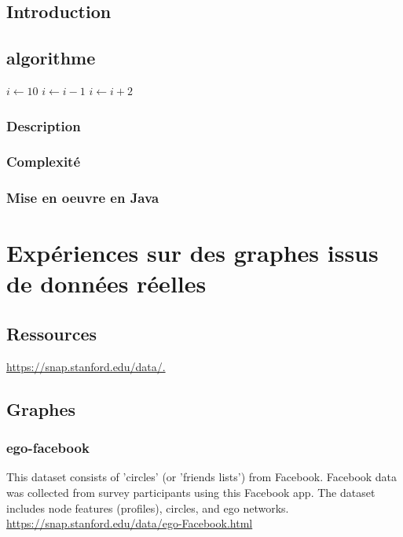 \subsection{Introduction}
\subsection{algorithme}
\begin{algorithmic}
\State $i \gets 10$
    \State $i \gets i-1$
\Else
        \State $i \gets i+2$
    \EndIf
\EndIf
\end{algorithmic}
\subsubsection{Description}
\subsubsection{Complexité}
\subsubsection{Mise en oeuvre en Java }

\newpage

\section{Expériences sur des graphes issus de données réelles }

\subsection{Ressources }

\cite{snapnets}



\href{https://snap.stanford.edu/data/.}{https://snap.stanford.edu/data/.}

\subsection{Graphes }
\subsubsection{ego-facebook}
This dataset consists of 'circles' (or 'friends lists') from Facebook. Facebook data was collected from survey participants using this Facebook app. The dataset includes node features (profiles), circles, and ego networks.
\href{https://snap.stanford.edu/data/ego-Facebook.html
}{https://snap.stanford.edu/data/ego-Facebook.html
}


